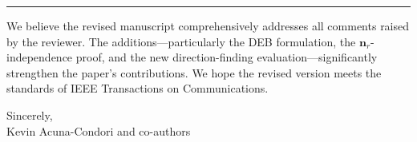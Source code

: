 \documentclass[11pt]{article}
\begin{document}
\vspace{18pt}
\hrule
\vspace{12pt}

\noindent We believe the revised manuscript comprehensively addresses all comments raised by the reviewer. The additions---particularly the DEB formulation, the $\mathbf{n}_r$-independence proof, and the new direction-finding evaluation---significantly strengthen the paper's contributions. We hope the revised version meets the standards of IEEE Transactions on Communications.

\vspace{12pt}
\noindent Sincerely,\\
Kevin Acuna-Condori and co-authors
\end{document}
